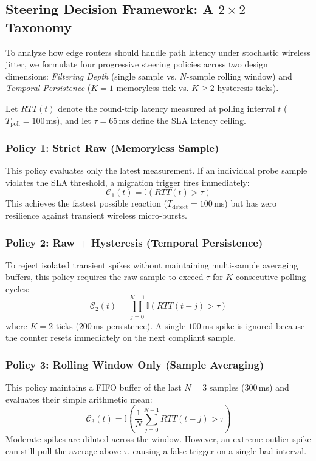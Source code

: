 \documentclass[conference]{IEEEtran}
\begin{document}
\textcolor{extensioncolor}{
\subsection{Steering Decision Framework: A $2 \times 2$ Taxonomy}
To analyze how edge routers should handle path latency under stochastic wireless jitter, we formulate four progressive steering policies across two design dimensions: \emph{Filtering Depth} (single sample vs. $N$-sample rolling window) and \emph{Temporal Persistence} ($K=1$ memoryless tick vs. $K \ge 2$ hysteresis ticks).

Let $RTT(t)$ denote the round-trip latency measured at polling interval $t$ ($T_{\text{poll}} = 100$\,ms), and let $\tau = 65$\,ms define the SLA latency ceiling.

\subsubsection{Policy 1: Strict Raw (Memoryless Sample)}
This policy evaluates only the latest measurement. If an individual probe sample violates the SLA threshold, a migration trigger fires immediately:
\begin{equation}
\mathcal{C}_{1}(t) = \mathbb{I}\left( RTT(t) > \tau \right)
\end{equation}
This achieves the fastest possible reaction ($T_{\text{detect}} = 100$\,ms) but has zero resilience against transient wireless micro-bursts.

\subsubsection{Policy 2: Raw + Hysteresis (Temporal Persistence)}
To reject isolated transient spikes without maintaining multi-sample averaging buffers, this policy requires the raw sample to exceed $\tau$ for $K$ consecutive polling cycles:
\begin{equation}
\mathcal{C}_{2}(t) = \prod_{j=0}^{K-1} \mathbb{I}\left( RTT(t - j) > \tau \right)
\end{equation}
where $K = 2$ ticks ($200$\,ms persistence). A single $100$\,ms spike is ignored because the counter resets immediately on the next compliant sample.

\subsubsection{Policy 3: Rolling Window Only (Sample Averaging)}
This policy maintains a FIFO buffer of the last $N = 3$ samples ($300$\,ms) and evaluates their simple arithmetic mean:
\begin{equation}
\mathcal{C}_{3}(t) = \mathbb{I}\left( \frac{1}{N}\sum_{j=0}^{N-1} RTT(t - j) > \tau \right)
\end{equation}
Moderate spikes are diluted across the window. However, an extreme outlier spike can still pull the average above $\tau$, causing a false trigger on a single bad interval.

}
\end{document}
